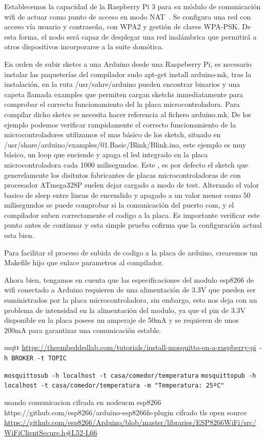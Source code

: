 Establecemos la capacidad de la Raspberry Pi 3 para su módulo de comunicación wifi de actuar como punto de acceso en modo NAT~\cite{raspberrypiasaccesspoint}. Se configura una red con acceso vía usuario y contraseña, con WPA2 y gestión de claves WPA-PSK. De esta forma, el nodo será capaz de desplegar una red inalámbrica que permitirá a otros dispositivos incorporarse a la suite domótica.

En orden de subir sketcs a una Arduino desde una Raspeberry Pi, es necesario instalar las paqueterías del compilador sudo apt-get install arduino-mk, tras la instalación, en la ruta /usr/sahre/arduino pueden encontrar binarios y una capeta llamada examples que permiten cargan sketchs inmediatamente para comprobar el correcto funcionamiento del la placa microcontroladora. Para compilar dicho sketcs se necesita hacer referencia al fichero arduino.mk. De los ejemplo podemos verificar rampidamente el correcto funcionamiento de la microcontroladores utilizamos el mas básico de los \gls{sketch}, situado en /usr/share/arduino/examples/01.Basic/Blink/Blink.ino, este ejemplo es muy básico, un loop que enciende y apaga el led integrado en la placa microcontroladora cada 1000 milisegundos. Este , es por defecto el sketch que generelamente los disitntos fabricantes de placas microcontroladoras de con procesador ATmega328P suelen dejar cargado a modo de test. Alterando el valor basico de sleep entre lineas de encendido y apagado a un valor menor como 50 milisegundos se puede comprobar si la comunicación del puerto com, y el compilador suben correctamente el codigo a la placa. Es importante verificar este punto antes de continuar y esta simple prueba cofirma que la configuración actual esta bien.

Para facilitar el proceso de subida de codigo a la placa de arduino, crearemos un Makefile hijo que enlace parametros al compilador.


Ahora bien, tengamos en cuenta que las especificaciones del modulo esp8266 de wifi conectado a Arduino requieren de una alimentación de 3.3V que pueden ser suministrados por la placa microcontroladora, sin embargo, esto nos deja con un problema de intensidad en la alimentación del modulo, ya que el pin de 3.3V disponible en la placa posees un amperaje de 50mA y se requieren de unos 200mA para garantizar una comunicación estable.


mqtt
\url{https://theembeddedlab.com/tutorials/install-mosquitto-on-a-raspberry-pi}
\verb|-h BROKER -t TOPIC|

\verb|mosquittosub -h localhost -t casa/comedor/temperatura|
\verb|mosquittopub -h localhost -t casa/comedor/temperatura -m "Temperatura: 25ºC"|


usando comunicacion cifrada en nodeucm esp8266
https://github.com/esp8266/arduino-esp8266fs-plugin
cifrado tls open source
\url{https://github.com/esp8266/Arduino/blob/master/libraries/ESP8266WiFi/src/WiFiClientSecure.h#L52-L66}